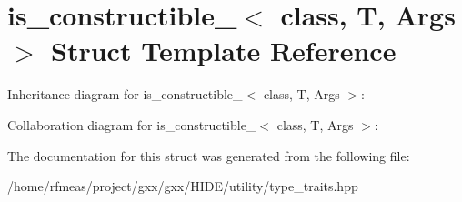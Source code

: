 \hypertarget{structis__constructible__}{}\section{is\+\_\+constructible\+\_\+$<$ class, T, Args $>$ Struct Template Reference}
\label{structis__constructible__}


Inheritance diagram for is\+\_\+constructible\+\_\+$<$ class, T, Args $>$\+:


Collaboration diagram for is\+\_\+constructible\+\_\+$<$ class, T, Args $>$\+:


The documentation for this struct was generated from the following file\+:\begin{DoxyCompactItemize}
\item 
/home/rfmeas/project/gxx/gxx/\+H\+I\+D\+E/utility/type\+\_\+traits.\+hpp\end{DoxyCompactItemize}
